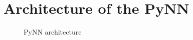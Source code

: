 \chapter{Architecture of the PyNN}
\label{appendix:a}
\begin{figure}[htb]
    \centering
    \begin{sideways}
        
    \end{sideways}
    \caption{PyNN architecture}
\end{figure}